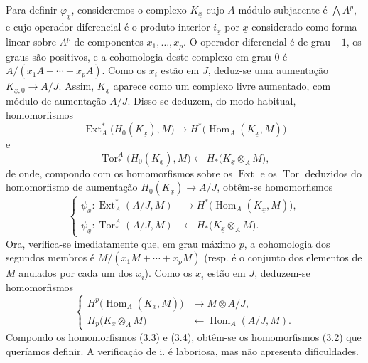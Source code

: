 \documentclass[11pt,twoside,openany]{book}
\numberwithin{equation}{section}
\theoremstyle{plain}
\theoremstyle{definition}
\theoremstyle{remark}
\begin{document}
Para definir $\varphi_{\underline{x}}$, consideremos o complexo
$K_{\underline{x}}$ cujo $A$-módulo subjacente é $\bigwedge A^{p}$, e
cujo operador diferencial é o produto interior $i_{\underline{x}}$ por
$\underline{x}$ considerado como forma linear sobre $A^{p}$ de componentes
$x_1,\ldots,x_p$. O operador diferencial é de grau $-1$, os graus são
positivos, e a cohomologia deste complexo em grau $0$ é
$A/(x_1A+\cdots+x_pA)$. Como os $x_i$ estão em $J$, deduz-se uma
aumentação $K_{\underline{x},0}\longrightarrow A/J$. Assim,
$K_{\underline{x}}$ aparece como um complexo livre aumentado, com módulo
de aumentação $A/J$. Disso se deduzem, do modo habitual, homomorfismos
\[
\operatorname{Ext}_{A}^{*}\bigl(H_0(K_{\underline{x}}),M\bigr)
\longrightarrow
H^{*}\bigl(\operatorname{Hom}_{A}(K_{\underline{x}},M)\bigr)
\]
e
\[
\operatorname{Tor}_{*}^{A}\bigl(H_0(K_{\underline{x}}),M\bigr)
\longleftarrow
H_{*}\bigl(K_{\underline{x}}\otimes_A M\bigr),
\]
de onde, compondo com os homomorfismos sobre os $\operatorname{Ext}$ e os
$\operatorname{Tor}$ deduzidos do homomorfismo de aumentação
$H_0(K_{\underline{x}})\longrightarrow A/J$, obtêm-se homomorfismos
\begin{equation}\tag{3.3}
\left\{
\begin{aligned}
\psi_{\underline{x}}:
\operatorname{Ext}_{A}^{*}(A/J,M)
&\longrightarrow H^{*}\bigl(\operatorname{Hom}_{A}(K_{\underline{x}},M)\bigr),\\
\psi_{\underline{x}}:
\operatorname{Tor}_{*}^{A}(A/J,M)
&\longleftarrow H_{*}\bigl(K_{\underline{x}}\otimes_A M\bigr).
\end{aligned}
\right.
\end{equation}
Ora, verifica-se imediatamente que, em grau máximo $p$, a cohomologia dos segundos
membros é $M/(x_1M+\cdots+x_pM)$ (resp. é o conjunto dos elementos de $M$
anulados por cada um dos $x_i$). Como os $x_i$ estão em $J$, deduzem-se
homomorfismos
\begin{equation}\tag{3.4}
\left\{
\begin{aligned}
H^{p}\bigl(\operatorname{Hom}_{A}(K_{\underline{x}},M)\bigr)
&\longrightarrow M\otimes A/J,\\
H_{p}\bigl(K_{\underline{x}}\otimes_A M\bigr)
&\longleftarrow\operatorname{Hom}_{A}(A/J,M).
\end{aligned}
\right.
\end{equation}
Compondo os homomorfismos (3.3) e (3.4), obtêm-se os homomorfismos (3.2)
que queríamos definir. A verificação de i. é laboriosa, mas não
apresenta dificuldades.
\end{document}
